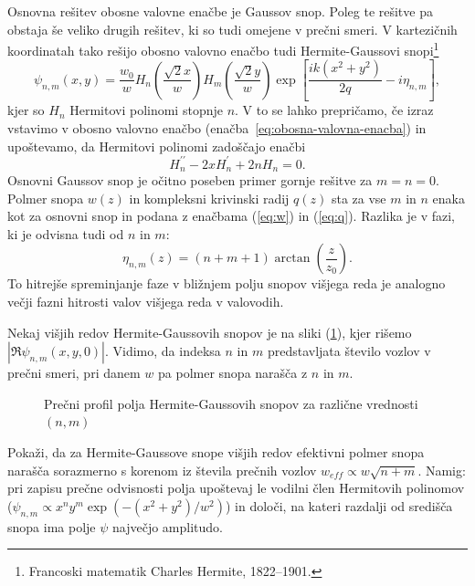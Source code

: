 Osnovna rešitev obosne valovne enačbe je Gaussov snop. Poleg te rešitve pa obstaja še veliko 
drugih rešitev, ki so tudi omejene v prečni smeri. V kartezičnih koordinatah tako rešijo obosno valovno enačbo
tudi Hermite-Gaussovi snopi\footnote{Francoski matematik Charles Hermite, 1822--1901.}
\begin{equation}
\psi_{n,m}(x,y)=\frac{w_{0}}{w}H_{n}\left(\frac{\sqrt{2}x}{w}\right)H_{m}\left(\frac{\sqrt{2}y}{w}\right)
\exp\left[\frac{ik(x^{2}+y^{2})}{2q}-i\eta_{n,m}\right],
\label{eq:Gauss-Hermitevi}
\end{equation}
kjer so $H_{n}$ Hermitovi polinomi stopnje $n$. V to se lahko
prepričamo, če izraz vstavimo v obosno valovno enačbo (enačba~\ref{eq:obosna-valovna-enacba}) in upoštevamo, 
da Hermitovi polinomi zadoščajo enačbi 
\begin{equation}
H_{n}^{\prime\prime}-2xH_{n}^{\prime}+2nH_{n}=0.
\end{equation}
Osnovni Gaussov snop je očitno poseben primer gornje rešitve za $m=n=0$.
Polmer snopa $w(z)$ in kompleksni krivinski radij $q(z)$ sta za
vse $m$ in $n$ enaka kot za osnovni snop in podana z enačbama (\ref{eq:w})
in (\ref{eq:q}). Razlika je v fazi, ki je odvisna tudi od $n$ in $m$: 
\begin{equation}
\eta_{n,m}\left(z\right)=(n+m+1)\arctan\left(\frac{z}{z_{0}}\right).
\end{equation}
To hitrejše spreminjanje faze v bližnjem polju snopov višjega reda
je analogno večji fazni hitrosti valov višjega reda v valovodih.

Nekaj višjih redov Hermite-Gaussovih snopov je na sliki (\ref{fig:Gauss-Hermitevi-snopi}),
kjer rišemo $|\Re\psi_{n,m}(x, y, 0)|$.
Vidimo, da indeksa $n$ in $m$ predstavljata število vozlov v prečni smeri,
pri danem $w$ pa polmer snopa narašča z $n$ in $m$. 

\begin{figure}[h]
\centering
\def\svgwidth{110truemm} 

\caption{Prečni profil polja Hermite-Gaussovih snopov za različne vrednosti $(n,m)$}
\label{fig:Gauss-Hermitevi-snopi}
\end{figure}

\begin{definition}
\label{naloga:HG}
Pokaži, da za Hermite-Gaussove snope višjih redov efektivni polmer snopa 
narašča sorazmerno s korenom iz števila prečnih vozlov $ w_{eff}\propto w\sqrt{n+m}$.
Namig: pri zapisu prečne odvisnosti polja upoštevaj le vodilni člen
 Hermitovih polinomov ($\psi_{n,m}\propto x^{n}y^{m}\exp(-(x^{2}+y^{2})/w^{2})$)
 in določi, na kateri razdalji od središča snopa ima polje $\psi$
največjo amplitudo.
\end{definition}


